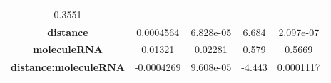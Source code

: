 \documentclass[]{article}
\begin{document}
\begin{longtable}[]{@{}ccccc@{}}
\begin{minipage}[t]{0.13\columnwidth}
0.3551\strut
\end{minipage}\tabularnewline
\begin{minipage}[t]{0.31\columnwidth}\centering\strut
\textbf{distance}\strut
\end{minipage} & \begin{minipage}[t]{0.15\columnwidth}\centering\strut
0.0004564\strut
\end{minipage} & \begin{minipage}[t]{0.15\columnwidth}\centering\strut
6.828e-05\strut
\end{minipage} & \begin{minipage}[t]{0.12\columnwidth}\centering\strut
6.684\strut
\end{minipage} & \begin{minipage}[t]{0.13\columnwidth}\centering\strut
2.097e-07\strut
\end{minipage}\tabularnewline
\begin{minipage}[t]{0.31\columnwidth}\centering\strut
\textbf{moleculeRNA}\strut
\end{minipage} & \begin{minipage}[t]{0.15\columnwidth}\centering\strut
0.01321\strut
\end{minipage} & \begin{minipage}[t]{0.15\columnwidth}\centering\strut
0.02281\strut
\end{minipage} & \begin{minipage}[t]{0.12\columnwidth}\centering\strut
0.579\strut
\end{minipage} & \begin{minipage}[t]{0.13\columnwidth}\centering\strut
0.5669\strut
\end{minipage}\tabularnewline
\begin{minipage}[t]{0.31\columnwidth}\centering\strut
\textbf{distance:moleculeRNA}\strut
\end{minipage} & \begin{minipage}[t]{0.15\columnwidth}\centering\strut
-0.0004269\strut
\end{minipage} & \begin{minipage}[t]{0.15\columnwidth}\centering\strut
9.608e-05\strut
\end{minipage} & \begin{minipage}[t]{0.12\columnwidth}\centering\strut
-4.443\strut
\end{minipage} & \begin{minipage}[t]{0.13\columnwidth}\centering\strut
0.0001117\strut
\end{minipage}\tabularnewline
\bottomrule
\end{longtable}
\end{document}
